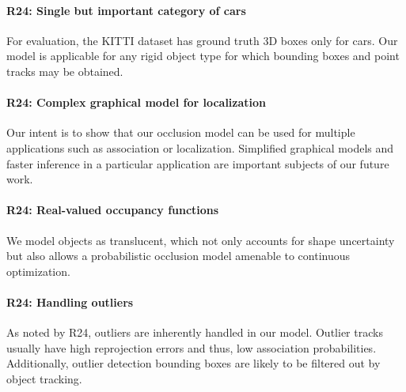\documentclass[10pt,twocolumn,letterpaper]{article}
\begin{document}
\vspace{-0.5cm}
\paragraph{R24: Single but important category of cars} For evaluation, the KITTI dataset has ground truth 3D boxes only for cars. Our model is applicable for any rigid object type for which bounding boxes and point tracks may be obtained.


\vspace{-0.5cm}
\paragraph{R24: Complex graphical model for localization} 
Our intent is to show that our occlusion model can be used for multiple applications such as association or localization. Simplified graphical models and faster inference in a particular application are important subjects of our future work.

\vspace{-0.5cm}
\paragraph{R24: Real-valued occupancy functions}
We model objects as translucent, which not only accounts for shape uncertainty but also allows a probabilistic occlusion model amenable to continuous optimization.

\vspace{-0.5cm}
\paragraph{R24: Handling outliers} 
As noted by R24, outliers are inherently handled in our model. Outlier tracks usually have high reprojection errors and thus, low association probabilities. Additionally, outlier detection bounding boxes are likely to be filtered out by object tracking. 

\vspace{-0.5cm}
\end{document}
